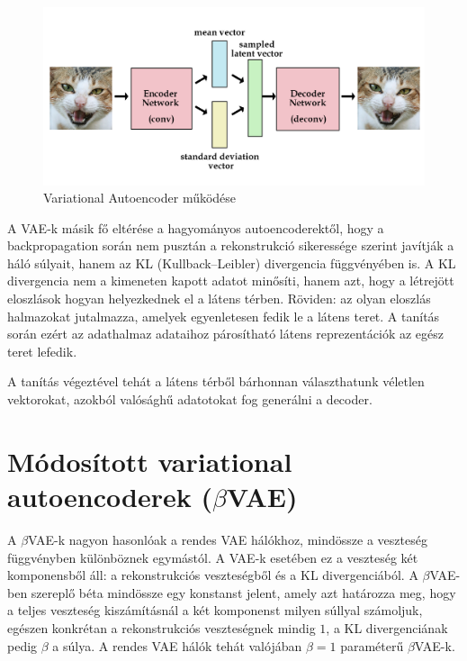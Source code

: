 \begin{figure}[h!]
\begin{center}
  
  
	\begin{center}
	\includegraphics[width=\linewidth]{vae.jpg}
	\end{center}
	
  \caption{Variational Autoencoder működése}\label{vae}
\end{center}
\end{figure}

A VAE-k másik fő eltérése a hagyományos autoencoderektől, hogy a backpropagation során nem pusztán a rekonstrukció sikeressége szerint javítják a háló súlyait, hanem az KL (Kullback–Leibler) divergencia függvényében is. A KL divergencia nem a kimeneten kapott adatot minősíti, hanem azt, hogy a létrejött eloszlások hogyan helyezkednek el a látens térben. Röviden: az olyan eloszlás halmazokat jutalmazza, amelyek egyenletesen fedik le a látens teret. A tanítás során ezért az adathalmaz adataihoz párosítható látens reprezentációk az egész teret lefedik.

A tanítás végeztével tehát a látens térből bárhonnan választhatunk véletlen vektorokat, azokból valósághű adatotokat fog generálni a decoder.

\section{Módosított variational autoencoderek ($\beta$VAE)}

A $\beta$VAE-k nagyon hasonlóak a rendes VAE hálókhoz, mindössze a veszteség függvényben különböznek egymástól. A VAE-k esetében ez a veszteség két komponensből áll: a rekonstrukciós veszteségből és a KL divergenciából. A $\beta$VAE-ben szereplő béta mindössze egy konstanst jelent, amely azt határozza meg, hogy a teljes veszteség kiszámításnál a két komponenst milyen súllyal számoljuk, egészen konkrétan a rekonstrukciós veszteségnek mindig $1$, a KL divergenciának pedig $\beta$ a súlya. A rendes VAE hálók tehát valójában $\beta=1$ paraméterű $\beta$VAE-k.

